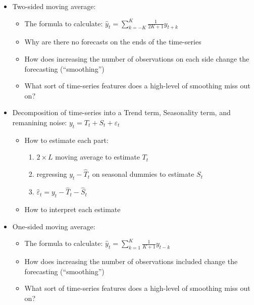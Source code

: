 \documentclass[12pt]{article}
\begin{document}
\begin{enumerate}
  \begin{itemize}
    \item Two-sided moving average: 
    \begin{itemize}
      \item The formula to calculate: $\hat{y}_t = \sum_{k = -K}^K \frac{1}{2K+1} y_{t + k}$

      \item Why are there no forecasts on the ends of the time-series
      
      \item How does increasing the number of observations on each side change the forecasting (``smoothing'')
      
      \item What sort of time-series features does a high-level of smoothing miss out on?
    \end{itemize}

    \item Decomposition of time-series into a Trend term, Seasonality term, and remanining noise: $y_t = T_t + S_t + \varepsilon_t$
    \begin{itemize}
      \item How to estimate each part: 
      \begin{enumerate}
        \item $2 \times L$ moving average to estimate $T_t$
        \item regressing $y_t - \hat{T}_t$ on seasonal dummies to estimate $S_t$
        \item $\hat{\varepsilon}_t = y_t - \hat{T}_t - \hat{S}_t$
      \end{enumerate}

      \item How to interpret each estimate 
    \end{itemize}

    \item One-sided moving average:
    \begin{itemize}
      \item The formula to calculate: $\hat{y}_t = \sum_{k = 1}^K \frac{1}{K+1} y_{t - k}$

      \item How does increasing the number of observations included change the forecasting (``smoothing'')

      \item What sort of time-series features does a high-level of smoothing miss out on?
    \end{itemize}


\end{itemize}
\end{enumerate}
\end{document}
